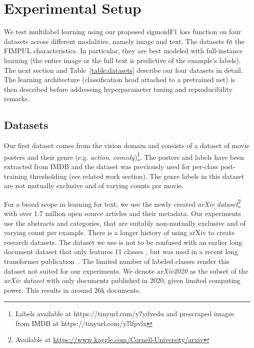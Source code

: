 
\section{Experimental Setup}
\label{sec:orgb44ba25}

We test multilabel learning using our proposed sigmoidF1 loss function on four datasets across different modalities, namely image and text. %
The datasets fit the FIMPUL characteristics. In particular, they are best modeled with full-instance learning (the entire image or the full text is predictive of the example's labels). The next section and Table~\ref{table:datasets} describe our four datasets in detail. The learning architecture (classification head attached to a pretrained net) is then described before addressing hyperparameter tuning and reproducibility remarks.


\subsection{Datasets}

Our first dataset comes from the vision domain and consists of a dataset of movie posters and their genre (e.g. \emph{action}, \emph{comedy})\footnote{Labels available at https://tinyurl.com/y7ydyedu and prescraped images from IMDB at https://tinyurl.com/y7lfpvlx}. The posters and labels have been extracted from IMDB and the dataset was previously used for per-class post-training thresholding \cite{moviePosters} (see related work section). The genre labels in this dataset are not mutually exclusive and of varying counts per movie. 

For a broad scope in learning for text, we use the newly created \emph{arXiv dataset}\footnote{Available at \url{https://www.kaggle.com/Cornell-University/arxiv}} with over 1.7 million open source articles and their metadata. Our experiments use the abstracts and categories, that are suitably non-mutually exclusive and of varying count per example. There is a longer history of using arXiv to create research datasets. The dataset we use is not to be confused with an earlier long document dataset that only features 11 classes \cite{oldarXiv}, but was used in a recent long transformer publication~\cite{bigBird}. The limited number of labeled classes render this dataset not suited for our experiments.  We denote \textit{arXiv2020} as the subset of the \emph{arXiv dataset} with only documents published in 2020, given limited computing power. This results in around 26k documents.

